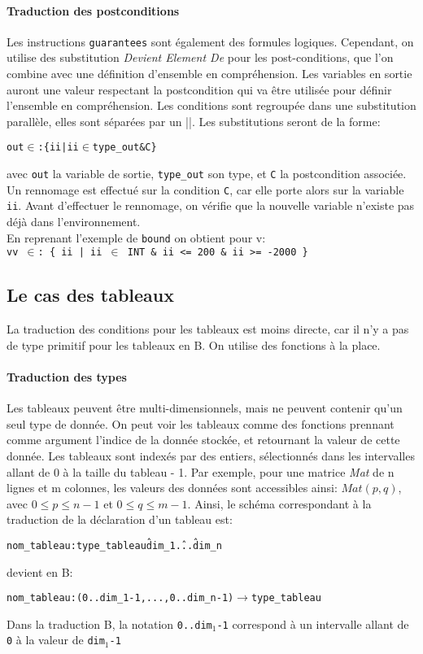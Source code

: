 \paragraph{Traduction des postconditions}
Les instructions \texttt{guarantees} sont également des formules
logiques. Cependant, on utilise des substitution \emph{Devient Element De} pour
les post-conditions, que l'on combine avec une définition d'ensemble
en compréhension. Les variables en sortie auront une valeur respectant
la postcondition qui va être utilisée pour définir l'ensemble en
compréhension. 
Les conditions sont regroupée dans une substitution parallèle,
elles sont séparées par un ||. 
Les substitutions seront de la forme:
\begin{alltt}
out \(\in\): \{ ii | ii \(\in\) type_out & C \}
\end{alltt}
avec \texttt{out} la variable de sortie, \texttt{type\_out} son type, et \texttt{C} la
postcondition associée. Un rennomage est effectué sur la condition \texttt{C},
car elle porte alors sur la variable \texttt{ii}. Avant d'effectuer le rennomage, on
vérifie que la nouvelle variable n'existe pas déjà dans l'environnement.\\
En reprenant l'exemple de \texttt{bound} on obtient pour v:\\
\texttt{vv $\in$: \{ ii | ii $\in$ INT \& ii <= 200 \& ii >= -2000 \}}


\subsection{Le cas des tableaux}
La traduction des conditions pour les tableaux est moins directe, car il n'y a
pas de type primitif pour les tableaux en B. On utilise des fonctions à la
place. 

\paragraph{Traduction des types}
Les tableaux peuvent être multi-dimensionnels, mais ne peuvent contenir qu'un
seul type de donnée. On peut voir les tableaux comme des fonctions prennant
comme argument l'indice de la donnée stockée, et retournant la valeur de cette
donnée. Les tableaux sont indexés par des entiers, sélectionnés dans les
intervalles allant de 0 à la taille du tableau - 1.
Par exemple, pour une matrice \emph{Mat} de n lignes et m colonnes, les valeurs
des données sont accessibles ainsi: $Mat(p, q)$, avec $0 \leq p \leq n-1$ et $0 \leq q
\leq m-1$.
Ainsi, le schéma correspondant à la traduction de la déclaration d'un tableau
est:
\begin{alltt}
nom\_tableau : type\_tableau \^ dim_1 \^ ... \^ dim_n
\end{alltt}
devient en B:
\begin{alltt}
nom\_tableau : (0..dim_1-1, ..., 0..dim_n-1) \(\rightarrow\) type\_tableau 
\end{alltt}
Dans la traduction B, la notation \texttt{0..dim$_1$-1} correspond à un
intervalle allant de \texttt{0} à la valeur de \texttt{dim$_1$-1}

